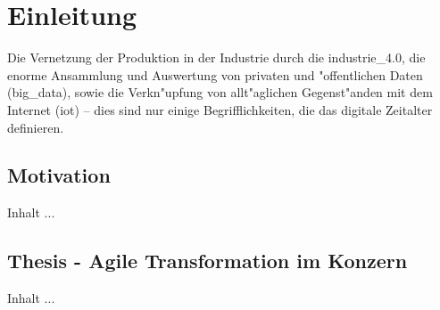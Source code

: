 
\chapter{Einleitung}
\minitoc
\vspace{1 cm} 

Die Vernetzung der Produktion in der Industrie durch die \gls{industrie_4.0}, die enorme Ansammlung und Auswertung von privaten und "offentlichen Daten (\gls{big_data}), sowie die Verkn"upfung von allt"aglichen Gegenst"anden mit dem Internet (\gls{iot}) -- dies sind nur einige Begrifflichkeiten, die das digitale Zeitalter definieren.


\section{Motivation}
Inhalt ...

\section{Thesis - Agile Transformation im Konzern}
Inhalt ...



